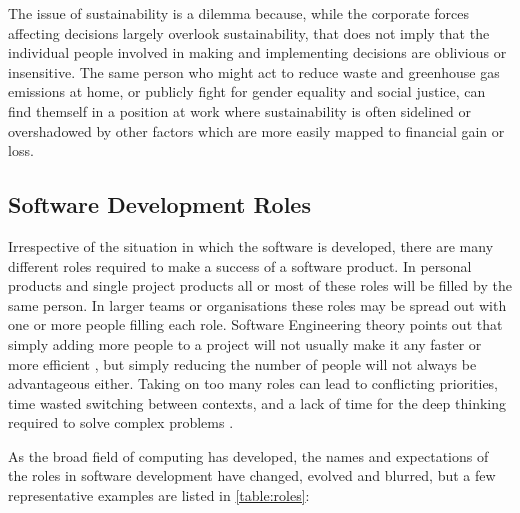 The issue of sustainability is a dilemma because, while the corporate forces affecting decisions largely overlook sustainability, that does not imply that the individual people involved in making and implementing decisions are oblivious or insensitive. The same person who might act to reduce waste and greenhouse gas emissions at home, or publicly fight for gender equality and social justice, can find themself in a position at work where sustainability is often sidelined or overshadowed by other factors which are more easily mapped to financial gain or loss.

\subsection{Software Development Roles}
\label{section:software development roles}

Irrespective of the situation in which the software is developed, there are many different roles required to make a success of a software product. In personal products and single project products all or most of these roles will be filled by the same person. In larger teams or organisations these roles may be spread out with one or more people filling each role. Software Engineering theory points out that simply adding more people to a project will not usually make it any faster or more efficient \citep{Brooks1995}, but simply reducing the number of people will not always be advantageous either. Taking on too many roles can lead to conflicting priorities, time wasted switching between contexts, and a lack of time for the deep thinking  required to solve complex problems \citep{Newport2016}.

As the broad field of computing has developed, the names and expectations of the roles in software development have changed, evolved and blurred, but a few representative examples are listed in \autoref{table:roles}:

